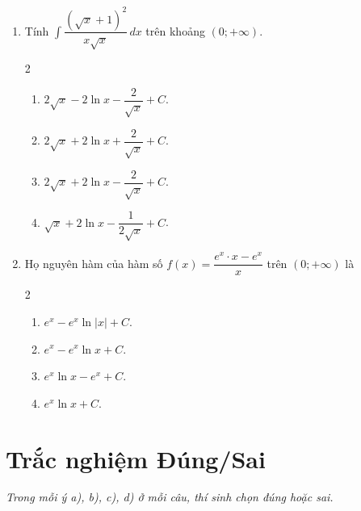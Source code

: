 \documentclass[12pt]{article}
\begin{document}
\begin{enumerate}[label=\textbf{Câu \arabic*.}]
		\item Tính $\displaystyle \int \dfrac{(\sqrt{x} + 1)^2}{x\sqrt{x}} \,dx$ trên khoảng $(0; +\infty)$.
		\begin{multicols}{2}
			\begin{enumerate}[label=\textbf{\Alph*.}]
				
				\item $2\sqrt{x} - 2\ln x - \dfrac{2}{\sqrt{x}} + C$.
				\item $2\sqrt{x} + 2\ln x + \dfrac{2}{\sqrt{x}} + C$.
				\item $2\sqrt{x} + 2\ln x - \dfrac{2}{\sqrt{x}} + C$.
				\item $\sqrt{x} + 2\ln x - \dfrac{1}{2\sqrt{x}} + C$.
			\end{enumerate}
		\end{multicols}
		
		\item Họ nguyên hàm của hàm số $f(x) = \dfrac{e^x \cdot x - e^x}{x}$ trên $(0; +\infty)$ là
		\begin{multicols}{2}
			\begin{enumerate}[label=\textbf{\Alph*.}]
				
				\item $e^x - e^x \ln|x| + C$.
				\item $e^x - e^x \ln x + C$.
				\item $e^x \ln x - e^x + C$.
				\item $e^x \ln x + C$.
			\end{enumerate}
		\end{multicols}
		
	\end{enumerate}
	
	\section{Trắc nghiệm Đúng/Sai}
	\textit{Trong mỗi ý a), b), c), d) ở mỗi câu, thí sinh chọn đúng hoặc sai.}
	
\end{document}
